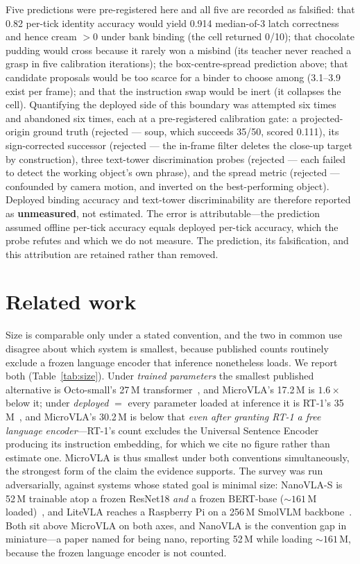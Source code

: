 \documentclass[10pt,letterpaper]{article}
\begin{document}
Five predictions were pre-registered here and all five are recorded as
falsified: that 0.82 per-tick identity accuracy would yield 0.914 median-of-3
latch correctness and hence cream $>0$ under bank binding (the cell returned
0/10); that chocolate pudding would cross because it rarely won a misbind (its
teacher never reached a grasp in five calibration iterations); the
box-centre-spread prediction above; that candidate proposals would be too
scarce for a binder to choose among (3.1--3.9 exist per frame); and that the
instruction swap would be inert (it collapses the cell). Quantifying the
deployed side of this boundary was attempted six times and abandoned six
times, each at a pre-registered calibration gate: a projected-origin ground
truth (rejected --- soup, which succeeds 35/50, scored 0.111), its
sign-corrected successor (rejected --- the in-frame filter deletes the close-up
target by construction), three text-tower discrimination probes (rejected
--- each failed to detect the working object's own phrase), and the spread
metric (rejected --- confounded by camera motion, and inverted on the
best-performing object). Deployed binding
accuracy and text-tower discriminability are therefore reported as
\textbf{unmeasured}, not estimated. The error is
attributable---the prediction assumed offline per-tick accuracy equals deployed
per-tick accuracy, which the probe refutes and which we do not measure. The
prediction, its falsification, and this attribution are retained rather than
removed.

\section{Related work}

Size is comparable only under a stated convention, and the two in common use
disagree about which system is smallest, because published counts routinely
exclude a frozen language encoder that inference nonetheless loads. We report
both (Table~\ref{tab:size}). Under \emph{trained parameters} the smallest
published alternative is Octo-small's 27\,M transformer~\citep{octo2024}, and
MicroVLA's 17.2\,M is $1.6\times$ below it; under \emph{deployed} $=$ every
parameter loaded at inference it is RT-1's 35\,M~\citep{brohan2022rt1}, and
MicroVLA's 30.2\,M is below that \emph{even after granting RT-1 a free language
encoder}---RT-1's count excludes the Universal Sentence Encoder producing its
instruction embedding, for which we cite no figure rather than estimate one.
MicroVLA is thus smallest under both conventions simultaneously, the strongest
form of the claim the evidence supports. The survey was run adversarially,
against systems whose stated goal is minimal size: NanoVLA-S is 52\,M trainable
atop a frozen ResNet18 \emph{and} a frozen BERT-base
(${\sim}161$\,M loaded)~\citep{nanovla2025}, and LiteVLA reaches a Raspberry Pi
on a 256\,M SmolVLM backbone~\citep{litevla2025}. Both sit above MicroVLA on
both axes, and NanoVLA is the convention gap in miniature---a paper named for
being nano, reporting 52\,M while loading ${\sim}161$\,M, because the frozen
language encoder is not counted.
\end{document}
